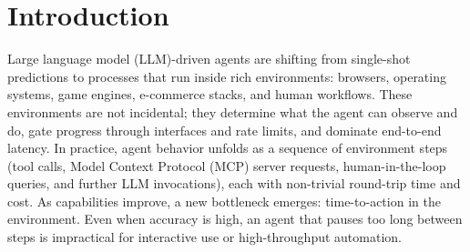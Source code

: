 \documentclass{article} %
\theoremstyle{plain} %
\theoremstyle{definition} %
\theoremstyle{remark} %
\begin{document}
\begin{abstract}





\end{abstract}
\vspace{-10pt}
\section{Introduction}
\label{sec:intro}

Large language model (LLM)-driven agents are shifting from single-shot predictions to processes that run inside rich environments: browsers, operating systems, game engines, e-commerce stacks, and human workflows.
These environments are not incidental; they determine what the agent can observe and do, gate progress through interfaces and rate limits, and dominate end-to-end latency.
In practice, agent behavior unfolds as a sequence of environment steps (tool calls, Model Context Protocol (MCP) server requests, human-in-the-loop queries, and further LLM invocations), each with non-trivial round-trip time and cost.
As capabilities improve, a new bottleneck emerges: time-to-action in the environment.
Even when accuracy is high, an agent that pauses too long between steps is impractical for interactive use or high-throughput automation. 
\end{document}
